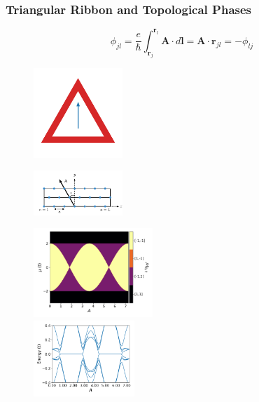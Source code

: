 \documentclass[xcolor=dvipsnames,10pt,aspectratio=169]{beamer}
\renewcommand{\vec}[1]{\mathbf{#1}}
\begin{document}
  \begin{frame}
    \frametitle{Triangular Ribbon and Topological Phases}

    \begin{multicols}{2}
      \small
      \begin{equation*}
        \phi_{jl} = \dfrac{e}{\hbar}\int_{\vec{r}_j}^{\vec{r}_l} \vec{A} \cdot d\vec{l} = \vec{A}\cdot\vec{r}_{jl} = -\phi_{lj}
      \end{equation*}
      \vspace{-08mm}
      \begin{figure}
        \includegraphics[width=0.30\textwidth]{./figures/hollow-triangle-constant-vector-potential.pdf}
      \end{figure}

      \vspace{-15mm}
      \begin{figure}
        \includegraphics[width=0.3\textwidth]{./figures/triangular-lattice-finite-width-ribbon.pdf}
      \end{figure}

      \pause

      \begin{figure}
        \includegraphics[width=0.4\textwidth]{./figures/topological-phase-diagram-1pi3-w-1.pdf} \\
        \hspace{-10mm}
        \pause
        \includegraphics[width=0.34\textwidth]{./figures/spectral-flow-nr-50-w-1-mu-1_6.pdf}
      \end{figure}
    \end{multicols}

  \end{frame}
\end{document}
